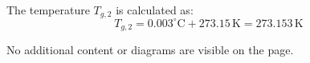The temperature \( T_{g,2} \) is calculated as:  
\[
T_{g,2} = 0.003^\circ\text{C} + 273.15 \, \text{K} = 273.153 \, \text{K}
\]  

No additional content or diagrams are visible on the page.